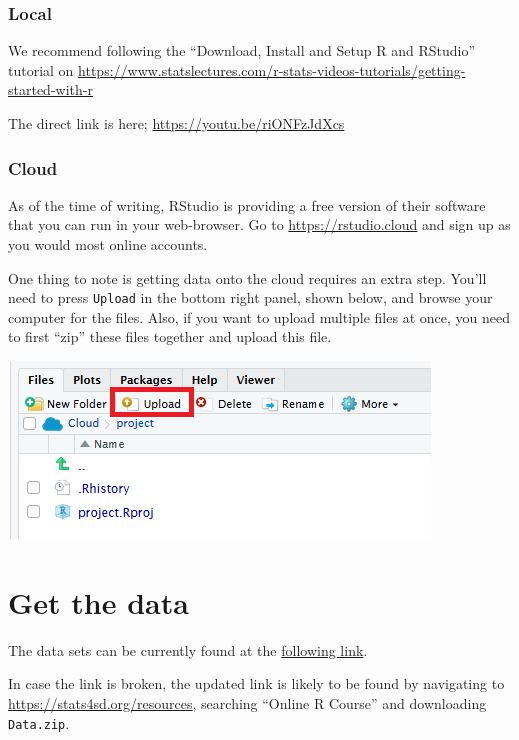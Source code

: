 \documentclass[]{book}
\begin{document}
\hypertarget{local}{%
\subsubsection{Local}\label{local}}

We recommend following the ``Download, Install and Setup R and RStudio'' tutorial on \url{https://www.statslectures.com/r-stats-videos-tutorials/getting-started-with-r}

The direct link is here; \url{https://youtu.be/riONFzJdXcs}

\hypertarget{cloud}{%
\subsubsection{Cloud}\label{cloud}}

As of the time of writing, RStudio is providing a free version of their software that you can run in your web-browser. Go to \url{https://rstudio.cloud} and sign up as you would most online accounts.

One thing to note is getting data onto the cloud requires an extra step. You'll need to press \texttt{Upload} in the bottom right panel, shown below, and browse your computer for the files. Also, if you want to upload multiple files at once, you need to first ``zip'' these files together and upload this file.

\includegraphics[width=\textwidth,height=\textheight]{Images/rstudio_cloud_upload_button}

\hypertarget{get-the-data}{%
\section{Get the data}\label{get-the-data}}

The data sets can be currently found at the \href{https://stats4sd.org/download/online-r-course_2019-05-14_13:50:11/2019-06-05_12:58:35_data.zip/Data.zip}{following link}.

In case the link is broken, the updated link is likely to be found by navigating to \url{https://stats4sd.org/resources}, searching ``Online R Course'' and downloading \texttt{Data.zip}.
\end{document}
